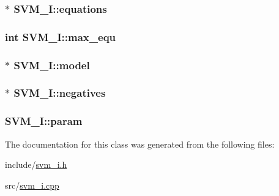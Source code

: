 \subsubsection[{equations}]{$\ast$ S\+V\+M\+\_\+\+I\+::equations}\hypertarget{classSVM__I_af905b6378094007502fa5d81f018a11b}{}\label{classSVM__I_af905b6378094007502fa5d81f018a11b}
\subsubsection[{max\+\_\+equ}]{\setlength{\rightskip}{0pt plus 5cm}int S\+V\+M\+\_\+\+I\+::max\+\_\+equ\hspace{0.3cm}{\ttfamily [protected]}}\hypertarget{classSVM__I_aaa890d6eaac46a447820a368f056eea7}{}\label{classSVM__I_aaa890d6eaac46a447820a368f056eea7}
\subsubsection[{model}]{$\ast$ S\+V\+M\+\_\+\+I\+::model}\hypertarget{classSVM__I_a7b7466c2246c73438ead77631278ff3a}{}\label{classSVM__I_a7b7466c2246c73438ead77631278ff3a}
\subsubsection[{negatives}]{$\ast$ S\+V\+M\+\_\+\+I\+::negatives}\hypertarget{classSVM__I_a8a56898f346ff15c5bb904ff6e001dad}{}\label{classSVM__I_a8a56898f346ff15c5bb904ff6e001dad}
\subsubsection[{param}]{ S\+V\+M\+\_\+\+I\+::param}\hypertarget{classSVM__I_afbec56807dada05e9e527587d25acfb6}{}\label{classSVM__I_afbec56807dada05e9e527587d25acfb6}


The documentation for this class was generated from the following files\+:\begin{DoxyCompactItemize}
\item 
include/\hyperlink{svm__i_8h}{svm\+\_\+i.\+h}\item 
src/\hyperlink{svm__i_8cpp}{svm\+\_\+i.\+cpp}\end{DoxyCompactItemize}
